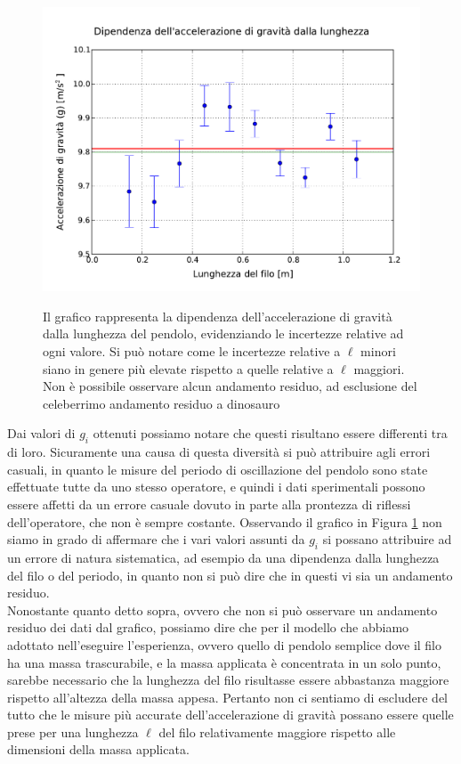 \begin{figure}
	\centering
	\includegraphics[width=120mm]{immagini/gravita.pdf}
	\label{fig:gravita}
	\caption{Il grafico rappresenta la dipendenza dell'accelerazione di gravità dalla lunghezza del pendolo, evidenziando le incertezze relative ad ogni valore. Si può notare come le incertezze relative a $\ell$ minori siano in genere più elevate rispetto a quelle relative a $\ell$ maggiori. Non è possibile osservare alcun andamento residuo, ad esclusione del celeberrimo andamento residuo a dinosauro}
\end{figure}

Dai valori di $g_i$ ottenuti possiamo notare che questi risultano essere differenti tra di loro. Sicuramente una causa di questa diversità si può attribuire agli errori casuali, in quanto le misure del periodo di oscillazione del pendolo sono state effettuate tutte da uno stesso operatore, e quindi i dati sperimentali possono essere affetti da un errore casuale dovuto in parte alla prontezza di riflessi dell'operatore, che non è sempre costante. %
Osservando il grafico in Figura \ref{fig:gravita} non siamo in grado di affermare che i vari valori assunti da $g_i$ si possano attribuire ad un errore di natura sistematica, ad esempio da una dipendenza dalla lunghezza del filo o del periodo, in quanto non si può dire che in questi vi sia un andamento residuo.\\
Nonostante quanto detto sopra, ovvero che non si può osservare un andamento residuo dei dati dal grafico, possiamo dire che per il modello che abbiamo adottato nell'eseguire l'esperienza, ovvero quello di pendolo semplice dove il filo ha una massa trascurabile, e la massa applicata è concentrata in un solo punto, sarebbe necessario che la lunghezza del filo risultasse essere abbastanza maggiore rispetto all'altezza della massa appesa. Pertanto non ci sentiamo di escludere del tutto che le misure più accurate dell'accelerazione di gravità possano essere quelle prese per una lunghezza $\ell$ del filo relativamente maggiore rispetto alle dimensioni della massa applicata.
